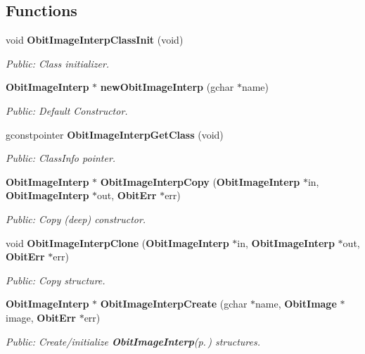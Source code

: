 \subsection*{Functions}
\begin{CompactItemize}
\item 
void {\bf Obit\-Image\-Interp\-Class\-Init} (void)
\begin{CompactList}\small\item\em Public: Class initializer. \item\end{CompactList}\item 
{\bf Obit\-Image\-Interp} $\ast$ {\bf new\-Obit\-Image\-Interp} (gchar $\ast$name)
\begin{CompactList}\small\item\em Public: Default Constructor. \item\end{CompactList}\item 
gconstpointer {\bf Obit\-Image\-Interp\-Get\-Class} (void)
\begin{CompactList}\small\item\em Public: Class\-Info pointer. \item\end{CompactList}\item 
{\bf Obit\-Image\-Interp} $\ast$ {\bf Obit\-Image\-Interp\-Copy} ({\bf Obit\-Image\-Interp} $\ast$in, {\bf Obit\-Image\-Interp} $\ast$out, {\bf Obit\-Err} $\ast$err)
\begin{CompactList}\small\item\em Public: Copy (deep) constructor. \item\end{CompactList}\item 
void {\bf Obit\-Image\-Interp\-Clone} ({\bf Obit\-Image\-Interp} $\ast$in, {\bf Obit\-Image\-Interp} $\ast$out, {\bf Obit\-Err} $\ast$err)
\begin{CompactList}\small\item\em Public: Copy structure. \item\end{CompactList}\item 
{\bf Obit\-Image\-Interp} $\ast$ {\bf Obit\-Image\-Interp\-Create} (gchar $\ast$name, {\bf Obit\-Image} $\ast$image, {\bf Obit\-Err} $\ast$err)
\begin{CompactList}\small\item\em Public: Create/initialize {\bf Obit\-Image\-Interp}{\rm (p.\,\pageref{structObitImageInterp})} structures. \item\end{CompactList}\item 

\end{CompactItemize}
